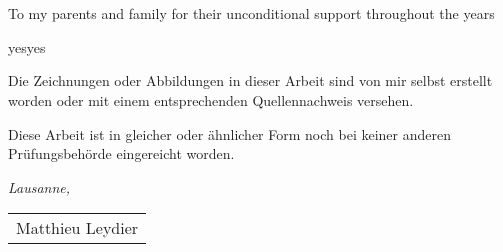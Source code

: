 \chapter*{}
\thispagestyle{empty}
To my parents and family for their unconditional support throughout the years 
\medskip

\noindent
yesyes
\medskip

\noindent
Die Zeichnungen oder Abbildungen in dieser Arbeit sind von mir selbst erstellt worden oder mit einem entsprechenden Quellennachweis versehen.
\medskip

\noindent
Diese Arbeit ist in gleicher oder ähnlicher Form noch bei keiner anderen Prüfungsbehörde eingereicht worden. 
\bigskip

\noindent\textit{Lausanne, \myTime}

\smallskip

\begin{flushright}
    \begin{tabular}{m{5cm}}
        \\ \hline
        \centering Matthieu Leydier \\
    \end{tabular}
\end{flushright}
